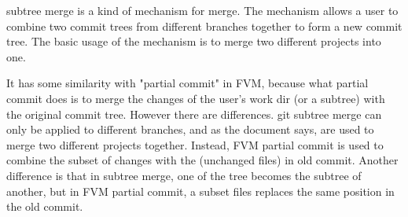 \Git subtree merge is a kind of mechanism for \git merge.
\cite{git-subtree-merge}
The mechanism allows a user to combine two
commit trees from different branches together to form a new commit tree.
The basic usage of the mechanism is to merge two different projects into one.

It has some similarity with "partial commit" in FVM, because what partial commit
does is to merge the changes of the user's work dir (or a subtree) with the
original commit tree. However there are differences. git subtree merge can only
be applied to different branches, and as the document says, are used to merge
two different projects together. Instead, FVM partial commit is used to combine
the subset of changes with the (unchanged files) in old commit. Another
difference is that in subtree merge, one of the tree becomes the subtree of
another, but in FVM partial commit, a subset files replaces the same position in the old commit.


